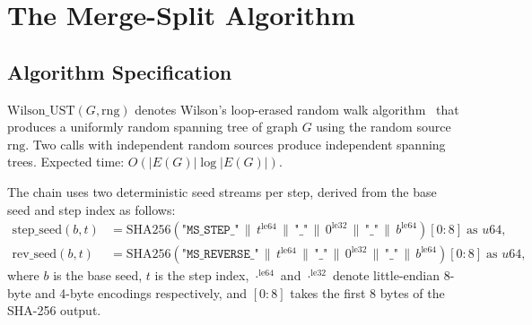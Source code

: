 \section{The Merge-Split Algorithm}
\label{sec:algorithm}

\subsection{Algorithm Specification}

\begin{definition}
\label{def:ust}
$\mathrm{Wilson\_UST}(G, \mathrm{rng})$ denotes Wilson's loop-erased random
walk algorithm~\citep{wilson1996} that produces a uniformly random spanning
tree of graph $G$ using the random source $\mathrm{rng}$.
Two calls with independent random sources produce independent spanning trees.
Expected time: $O(|E(G)| \log |E(G)|)$.
\end{definition}

The \mergesplit{} chain uses two deterministic seed streams per step,
derived from the base seed and step index as follows:
\begin{align}
  \mathrm{step\_seed}(b, t)
    &= \mathrm{SHA256}\!\left(
         \texttt{"MS\_STEP\_"} \,\|\, t^{\mathrm{le64}} \,\|\,
         \texttt{"\_"} \,\|\, 0^{\mathrm{le32}} \,\|\,
         \texttt{"\_"} \,\|\, b^{\mathrm{le64}}
       \right)[0{:}8]
       \;\text{as } u64, \label{eq:step-seed}\\
  \mathrm{rev\_seed}(b, t)
    &= \mathrm{SHA256}\!\left(
         \texttt{"MS\_REVERSE\_"} \,\|\, t^{\mathrm{le64}} \,\|\,
         \texttt{"\_"} \,\|\, 0^{\mathrm{le32}} \,\|\,
         \texttt{"\_"} \,\|\, b^{\mathrm{le64}}
       \right)[0{:}8]
       \;\text{as } u64, \label{eq:rev-seed}
\end{align}
where $b$ is the base seed, $t$ is the step index, $\cdot^{\mathrm{le64}}$
and $\cdot^{\mathrm{le32}}$ denote little-endian 8-byte and 4-byte encodings
respectively, and $[0{:}8]$ takes the first 8 bytes of the SHA-256 output.

